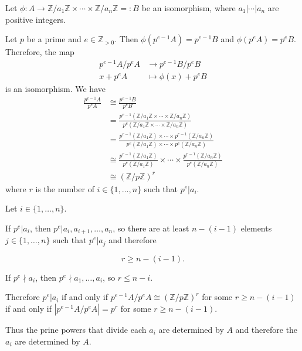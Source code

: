 \documentclass{article}
\begin{document}
Let $\phi: A \rightarrow \mathbb{Z}/a_1\mathbb{Z} \times \cdots \times \mathbb{Z}/a_n\mathbb{Z} =: B$ be an isomorphism, where $a_1|\cdots | a_n$ are positive integers.

Let $p$ be a prime and $e\in \mathbb{Z}_{>0}$. Then $\phi(p^{e-1}A)=p^{e-1}B$ and $\phi(p^eA)=p^eB$. Therefore, the map
\begin{align*}
    p^{e-1}A/p^eA & \rightarrow p^{e-1}B/p^eB \\
    x+p^eA        & \mapsto \phi(x) + p^eB
\end{align*}
is an isomorphism. We have
\begin{align*}
    \frac{p^{e-1}A}{p^eA} & \cong \frac{p^{e-1}B}{p^eB}                                                                                                                                                       \\
                          & = \frac{p^{e-1}(\mathbb{Z}/a_1\mathbb{Z} \times \cdots \times \mathbb{Z}/a_n\mathbb{Z})}{p^e(\mathbb{Z}/a_1\mathbb{Z} \times \cdots \times \mathbb{Z}/a_n \mathbb{Z})}            \\
                          & = \frac{p^{e-1}(\mathbb{Z}/a_1\mathbb{Z})\times \cdots \times p^{e-1}(\mathbb{Z}/a_n\mathbb{Z})}{p^e(\mathbb{Z}/a_1\mathbb{Z})\times \cdots \times p^e(\mathbb{Z}/a_n\mathbb{Z})} \\
                          & \cong \frac{p^{e-1}(\mathbb{Z}/a_1\mathbb{Z})}{p^e(\mathbb{Z}/a_1\mathbb{Z})} \times \cdots \times \frac{p^{e-1}(\mathbb{Z}/a_n\mathbb{Z})}{p^e(\mathbb{Z}/a_n\mathbb{Z})}        \\
                          & \cong (\mathbb{Z}/p\mathbb{Z})^r
\end{align*}
where $r$ is the number of $i\in \{1,\dots,n\}$ such that $p^e | a_i$.

Let $i\in \{1,\dots,n\}$.

If $p^e | a_i$, then $p^e | a_i, a_{i+1},\dots, a_n$, so there are at least $n-(i-1)$ elements $j\in \{1,\dots,n\}$ such that $p^e | a_j$ and therefore

$$r \ge n - (i-1).$$

If $p^e \nmid a_i$, then $p^e \nmid a_1,\dots, a_i$, so $r \le n-i$.

Therefore $p^e| a_i$ if and only if $p^{e-1}A/p^eA \cong (\mathbb{Z}/p\mathbb{Z})^r$ for some $r \ge n-(i-1)$ if and only if $|p^{e-1}A/p^eA| = p^r$ for some $r \ge n-(i-1)$.

Thus the prine powers that divide each $a_i$ are determined by $A$ and therefore the $a_i$ are determined by $A$.
\end{document}
